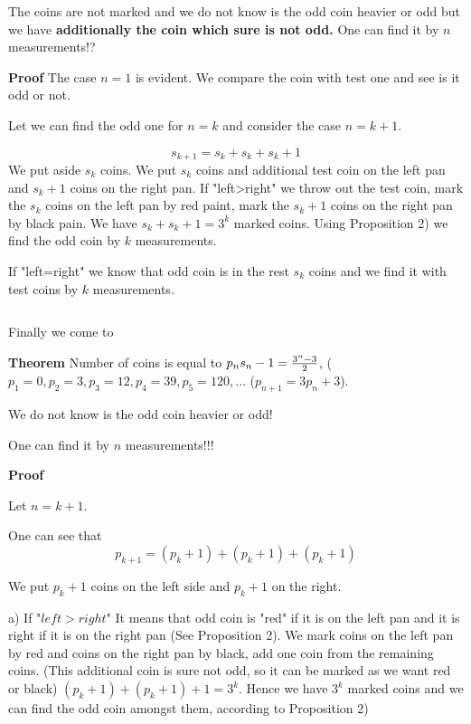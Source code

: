    The coins are not marked and
   we do not know is the odd coin heavier or odd but we have
    {\bf additionally the coin which sure is not odd.}
    One can find it by $n$ measurements!?

    {\bf Proof} The case $n=1$ is evident. We compare the coin
    with test one and see is it odd or not.


   Let we can find the odd one for $n=k$
   and consider the case $n=k+1$.

                   $$
    s_{k+1}=s_k+s_k+s_k+1
                    $$
    We put aside $s_k$ coins. We put $s_k$ coins and
     additional test coin on the left pan and $s_k+1$
      coins on the right pan.
      If "left>right" we throw out the test coin,
      mark the $s_k$ coins on the left pan by red paint,
       mark the $s_k+1$ coins on the right pan by black pain.
       We have $s_k+s_k+1=3^k$ marked coins. Using
        Proposition 2) we find the odd coin by $k$ measurements.

        If "left=right" we know that odd coin
        is in the rest $s_k$ coins and we find it
        with test coins by $k$ measurements.


                $$ $$

   Finally we come to

           {\bf Theorem}
     Number of coins is equal to $p_n s_n-1={3^n-3\over 2}$,
    ($p_1=0,p_2=3,p_3=12,p_4=39,p_5=120,\dots$ ($p_{n+1}=3p_n+3$).

   We do not know is the odd coin heavier or odd!

    One can find it by $n$ measurements!!!


      {\bf Proof}


    Let $n=k+1$.

   One can see that
                  $$
                 p_{k+1}=(p_k+1)+(p_k+1)+(p_k+1)
                    $$

           We put $p_k+1$ coins on the left side and $p_k+1$ on the right.

           a) If "$left>right$" It means
            that odd coin is "red" if it is on the
           left pan and it is right if it is on the
            right pan (See Proposition 2).
            We mark coins on the left pan by red and coins on the
            right pan by black, add one coin from
            the remaining coins. (This additional coin is sure not odd,
            so it can be marked as we want red or black)
               $(p_k+1)+(p_k+1)+1=3^k$. Hence we have $3^k$
               marked coins and we can find the odd coin amongst
               them, according to Proposition 2)



